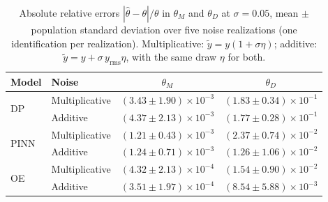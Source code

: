 \begin{table}[t]
\centering
\caption{Absolute relative errors $|\hat\theta-\theta|/\theta$ in $\theta_M$ and $\theta_D$ at $\sigma=0.05$, mean $\pm$ population standard deviation over five noise realizations (one identification per realization). Multiplicative: $\tilde{y}=y(1+\sigma\eta)$; additive: $\tilde{y}=y+\sigma\,y_{\mathrm{rms}}\eta$, with the same draw $\eta$ for both.}
\label{tab:noise_realizations}
\footnotesize
\setlength{\tabcolsep}{3pt}
\begin{tabular}{llcc}
\toprule
Model & Noise & $\theta_M$ & $\theta_D$ \\
\midrule
\multirow{2}{*}{DP} & Multiplicative & $(3.43\pm1.90)\times10^{-3}$ & $(1.83\pm0.34)\times10^{-1}$ \\
 & Additive & $(4.37\pm2.13)\times10^{-3}$ & $(1.77\pm0.28)\times10^{-1}$ \\
\midrule
\multirow{2}{*}{PINN} & Multiplicative & $(1.21\pm0.43)\times10^{-3}$ & $(2.37\pm0.74)\times10^{-2}$ \\
 & Additive & $(1.24\pm0.71)\times10^{-3}$ & $(1.26\pm1.06)\times10^{-2}$ \\
\midrule
\multirow{2}{*}{OE} & Multiplicative & $(4.32\pm2.13)\times10^{-4}$ & $(1.54\pm0.90)\times10^{-2}$ \\
 & Additive & $(3.51\pm1.97)\times10^{-4}$ & $(8.54\pm5.88)\times10^{-3}$ \\
\bottomrule
\end{tabular}
\end{table}
